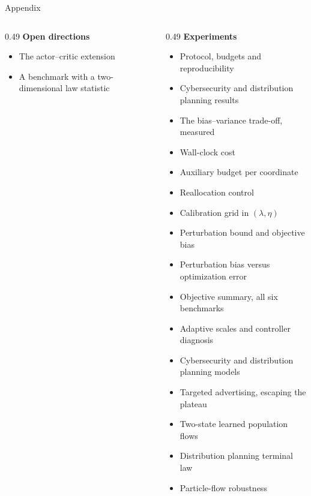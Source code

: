 \documentclass[9pt]{beamer}
\begin{document}
\begin{frame}{Appendix}
\begin{columns}[T]
\begin{column}{0.49\textwidth}
\vspace{0.2cm}
\textbf{Open directions}
\begin{itemize}\scriptsize
  \item The actor--critic extension
  \item A benchmark with a two-dimensional law statistic
\end{itemize}
\end{column}
\begin{column}{0.49\textwidth}
\textbf{Experiments}
\begin{itemize}\scriptsize
  \item Protocol, budgets and reproducibility
  \item Cybersecurity and distribution planning results
  \item The bias--variance trade-off, measured
  \item Wall-clock cost
  \item Auxiliary budget per coordinate
  \item Reallocation control
  \item Calibration grid in $(\lambda,\eta)$
  \item Perturbation bound and objective bias
  \item Perturbation bias versus optimization error
  \item Objective summary, all six benchmarks
  \item Adaptive scales and controller diagnosis
  \item Cybersecurity and distribution planning models
  \item Targeted advertising, escaping the plateau
  \item Two-state learned population flows
  \item Distribution planning terminal law
  \item Particle-flow robustness
\end{itemize}
\end{column}
\end{columns}
\end{frame}

\end{document}
